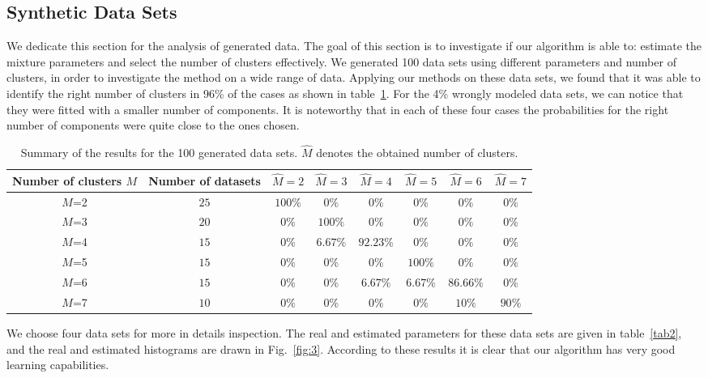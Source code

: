 \documentclass[journal,10pt]{elsart}
\begin{document}
\subsection{Synthetic Data Sets}
We dedicate this section for the analysis of generated data.
The goal of this section is to investigate if our algorithm is able to: estimate the mixture parameters and select the number of clusters effectively.
We generated 100 data sets using different parameters and number of clusters, in order to investigate the method on a wide range of data.
Applying our methods on these data sets, we found that it was able to identify the right number of clusters in 96\% of the cases
as shown in table~\ref{tab1}.
For the 4\% wrongly modeled data sets, we can notice that they were fitted with a smaller number of components.
It is noteworthy that in each of these four cases the probabilities for the right number of components were quite close to the ones chosen.
\begin{table}[ht!]
\begin{center}
\caption{Summary of the results for the 100 generated data sets. $\hat{M}$ denotes the obtained number of clusters. \label{tab1}}
\tiny
\begin{tabular}{|c| c| c| c| c| c| c| c|}
  \hline
Number of clusters $M$ & Number of datasets & $\hat{M}=2$ & $\hat{M}=3$ & $\hat{M}=4$  & $\hat{M}=5$ & $\hat{M}=6$ & $\hat{M}=7$ \\
\hline
$M$=2 &$25$ &$100\%$ &$0\%$ &$0\%$ &$0\%$ &$0\%$&$0\%$\\
$M$=3 &$20$&$0\%$ &$100\%$ &$0\%$ &$0\%$ &$0\%$&$0\%$\\
$M$=4 &$15$ &$0\%$ &$6.67\%$ &$92.23\%$ &$0\%$ &$0\%$&$0\%$\\
$M$=5 &$15$ &$0\%$ &$0\%$ &$0\%$ &$100\%$ &$0\%$&$0\%$\\
$M$=6 &$15$ &$0\%$ &$0\%$ &$6.67\%$ &$6.67\%$ &$86.66\%$&$0\%$\\
$M$=7 &$10$ &$0\%$ &$0\%$ &$0\%$&$0\%$ &$10\%$&$90\%$\\
  \hline
\end{tabular}
\end{center}
\end{table}
We choose four data sets for more in details inspection.
The real and estimated parameters for these data sets are given in table~\ref{tab2}, and the real and estimated histograms are drawn in Fig.~\ref{fig:3}.
According to these results it is clear that our algorithm has very good learning capabilities.
\end{document}
